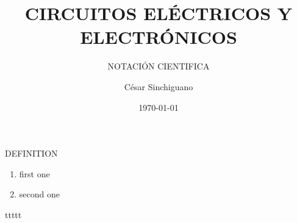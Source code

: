 \documentclass{beamer}
\title[ShortTitle]{CIRCUITOS ELÉCTRICOS Y ELECTRÓNICOS}
\subtitle{NOTACIÓN CIENTIFICA}
\author{César Sinchiguano}
\institute{ULEAM}
\date{\today}
\begin{document}
\begin{frame}
\titlepage
\end{frame}


\begin{frame}[t]{DEFINITION}

\begin{enumerate}
\item first one
\item second one
\end{enumerate}



\end{frame}


\begin{frame}
ttttt
\end{frame}
\end{document}
